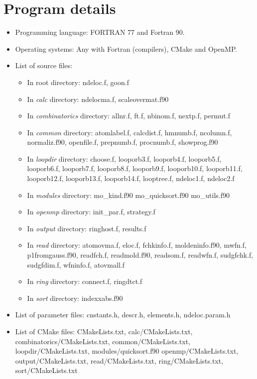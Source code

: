 \documentclass[a4paper,11pt,openany]{memoir}
\begin{document}
\section{Program details}
\begin{itemize}
	\item Programming language: FORTRAN 77 and Fortran 90.
	\item Operating systems: Any with Fortran (compilers), CMake and OpenMP.
	\item List of source files:
			\begin{itemize}
				\item In root directory:
					ndeloc.f,
					goon.f
				\item In \emph{calc} directory:
					ndelocma.f,
					scaleovermat.f90
				\item In \emph{combinatorics} directory:
					allnr.f,
					ft.f,
					nbinom.f,
					nextp.f,
					permut.f
				\item In \emph{common} directory:
					atomlabel.f,
					calcdist.f,
					hmnumb.f,
					ncolumn.f,
					normaliz.f90,
					openfile.f,
					prepnumb.f,
					procnumb.f,
					showprog.f90
				\item In \emph{loopdir} directory:
					choose.f,
					looporb3.f,
					looporb4.f,
					looporb5.f,
					looporb6.f,
					looporb7.f,
					looporb8.f,
					looporb9.f,
					looporb10.f,
					looporb11.f,
					looporb12.f,
					looporb13.f,
					looporb14.f,
					looptree.f,
					ndeloc1.f,
					ndeloc2.f
				\item In \emph{modules} directory:
					mo\_kind.f90
					mo\_quicksort.f90
					mo\_utils.f90
				\item In \emph{openmp} directory:
					init\_par.f,
					strategy.f
				\item In \emph{output} directory:
					ringhost.f,
					results.f
				\item In \emph{read} directory:
					atomovma.f,
					eloc.f,
					fchkinfo.f,
					moldeninfo.f90,
					mwfn.f,
					p1fromgauss.f90,
					readfch.f,
					readmold.f90,
					readsom.f,
					readwfn.f,
					sudgfchk.f,
					sudgfdim.f,
					wfninfo.f,
					atovmall.f
				\item In \emph{ring} directory:
					connect.f,
					ringdtct.f
				\item In \emph{sort} directory:
					indexxabs.f90
			\end{itemize}
	\item List of parameter files:
					cnstants.h,
					descr.h,
					elements.h,
					ndeloc.param.h
	\item List of CMake files:
					CMakeLists.txt,
					calc/CMakeLists.txt,
					combinatorics/CMakeLists.txt,
					common/CMakeLists.txt,
					loopdir/CMakeLists.txt,
					modules/quicksort.f90
					openmp/CMakeLists.txt,
					output/CMakeLists.txt,
					read/CMakeLists.txt,
					ring/CMakeLists.txt,
					sort/CMakeLists.txt
\end{itemize}
\end{document}
